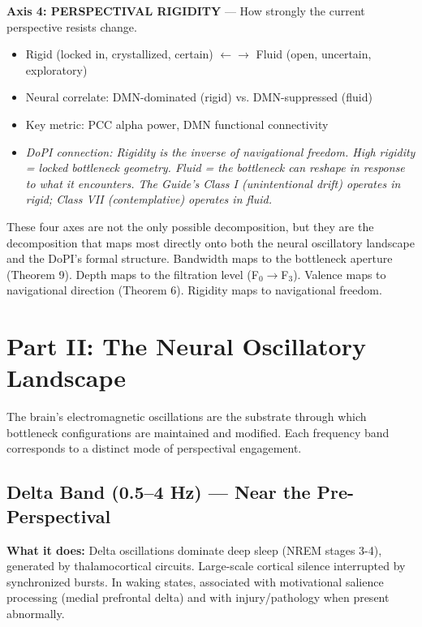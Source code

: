 \textbf{Axis 4: PERSPECTIVAL RIGIDITY} — How strongly the current perspective resists change.

\begin{itemize}[nosep,leftmargin=*]
  \item Rigid (locked in, crystallized, certain) $\leftarrow$$\rightarrow$ Fluid (open, uncertain, exploratory)
  \item Neural correlate: DMN-dominated (rigid) vs. DMN-suppressed (fluid)
  \item Key metric: PCC alpha power, DMN functional connectivity
  \item \textit{DoPI connection: Rigidity is the inverse of navigational freedom. High rigidity = locked bottleneck geometry. Fluid = the bottleneck can reshape in response to what it encounters. The Guide's Class I (unintentional drift) operates in rigid; Class VII (contemplative) operates in fluid.}
\end{itemize}


These four axes are not the only possible decomposition, but they are the decomposition that maps most directly onto both the neural oscillatory landscape and the DoPI's formal structure. Bandwidth maps to the bottleneck aperture (Theorem 9). Depth maps to the filtration level (F$_0$$\rightarrow$F$_3$). Valence maps to navigational direction (Theorem 6). Rigidity maps to navigational freedom.


\bigskip\noindent\makebox[\textwidth]{\color{rulegray}\rule{5cm}{0.3pt}}\bigskip


\section*{Part II: The Neural Oscillatory Landscape}


The brain's electromagnetic oscillations are the substrate through which bottleneck configurations are maintained and modified. Each frequency band corresponds to a distinct mode of perspectival engagement.


\subsection*{Delta Band (0.5–4 Hz) — Near the Pre-Perspectival}


\textbf{What it does:} Delta oscillations dominate deep sleep (NREM stages 3-4), generated by thalamocortical circuits. Large-scale cortical silence interrupted by synchronized bursts. In waking states, associated with motivational salience processing (medial prefrontal delta) and with injury/pathology when present abnormally.


